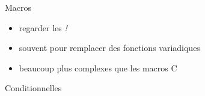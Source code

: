\begin{frame}[fragile]{Macros}
\protect\hypertarget{macros}{}
\begin{Shaded}
\begin{Highlighting}[]
\OperatorTok{\{}
    \NormalTok{(}\OperatorTok{,} \NormalTok{)}\OperatorTok{;}
    \OperatorTok{=} \NormalTok{[}\OperatorTok{,}\OperatorTok{,}\OperatorTok{,}\NormalTok{]}\OperatorTok{;}
\OperatorTok{\}}
\end{Highlighting}
\end{Shaded}

\begin{itemize}
\tightlist
\item
  regarder les \emph{!}
\item
  souvent pour remplacer des fonctions variadiques
\item
  beaucoup plus complexes que les macros C
\end{itemize}
\end{frame}

\begin{frame}[fragile]{Conditionnelles}
\protect\hypertarget{conditionnelles}{}
\begin{Shaded}
\begin{Highlighting}[]
    \OperatorTok{\%}  \OperatorTok{==}  \OperatorTok{\{}
        \NormalTok{(}\NormalTok{)}\OperatorTok{;}
    \OperatorTok{\}}
    \OperatorTok{=} \OperatorTok{\%}  \OperatorTok{==}  \OperatorTok{\{}\OperatorTok{/}  \OperatorTok{\}}  \OperatorTok{\{}\OperatorTok{*} \OperatorTok{+}  \OperatorTok{\};}
\end{Highlighting}
\end{Shaded}
\end{frame}

